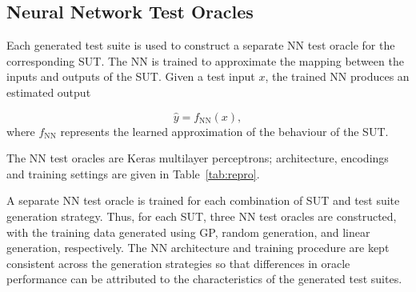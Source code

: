\documentclass[runningheads]{llncs}
\begin{document}

\subsection{Neural Network Test Oracles}
\label{sec:oracle}

Each generated test suite is used to construct a separate NN test oracle for the corresponding SUT. The NN is trained to approximate the mapping between the inputs and outputs of the SUT. Given a test input $x$, the trained NN produces an estimated output

\begin{equation}
\hat{y} = f_{\mathrm{NN}}(x),
\end{equation}
where $f_{\mathrm{NN}}$ represents the learned approximation of the behaviour of the SUT.

The NN test oracles are Keras multilayer perceptrons; architecture, encodings and training settings are given in Table~\ref{tab:repro}.

A separate NN test oracle is trained for each combination of SUT and test suite generation strategy. Thus, for each SUT, three NN test oracles are constructed, with the training data generated using GP, random generation, and linear generation, respectively. The NN architecture and training procedure are kept consistent across the generation strategies so that differences in oracle performance can be attributed to the characteristics of the generated test suites.
\end{document}
